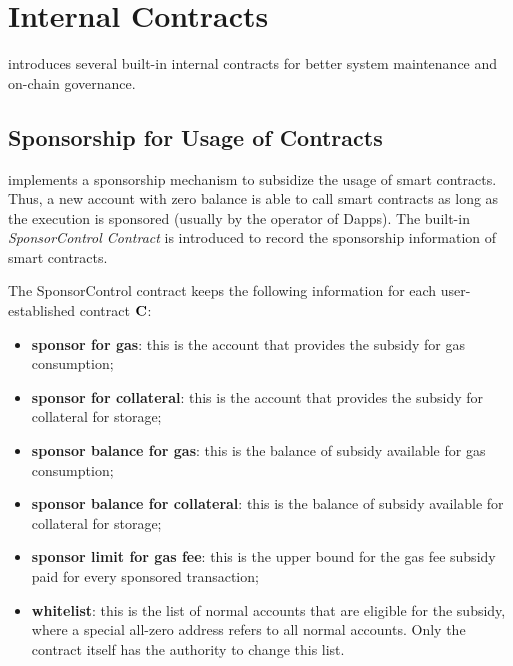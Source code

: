 \section{Internal Contracts}
\label{sec:internal}
\name introduces several built-in internal contracts for better system maintenance and on-chain governance.



\subsection{Sponsorship for Usage of Contracts}
\label{sec:sponsor}

\name implements a sponsorship mechanism to subsidize the usage of smart contracts. 
Thus, a new account with zero balance is able to call smart contracts as long as the execution is sponsored (usually by the operator of Dapps).
The built-in \emph{SponsorControl Contract} is introduced to record the sponsorship information of smart contracts.

The SponsorControl contract keeps the following information for each user-established contract $\mathbf{C}$:
\begin{itemize}[nosep]
	\item {\bf sponsor for gas}: this is the account that provides the subsidy for gas consumption;

	\item {\bf sponsor for collateral}: this is the account that provides the subsidy for collateral for storage; 

	\item {\bf sponsor balance for gas}: this is the balance of subsidy available for gas consumption;

	\item {\bf sponsor balance for collateral}: this is the balance of subsidy available for collateral for storage;

	\item {\bf sponsor limit for gas fee}: this is the upper bound for the gas fee subsidy paid for every sponsored transaction;

	\item {\bf whitelist}: this is the list of normal accounts that are eligible for the subsidy, where a special all-zero address refers to all normal accounts.
	Only the contract itself has the authority to change this list.
\end{itemize}


